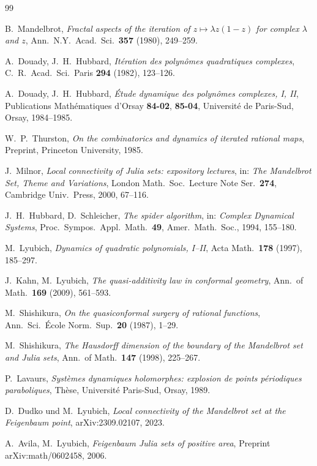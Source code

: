\documentclass[12pt,a4paper]{amsart}
\theoremstyle{definition}
\theoremstyle{remark}
\begin{document}
\begin{thebibliography}{99}


B.~Mandelbrot,
\textit{Fractal aspects of the iteration of $z \mapsto \lambda z(1-z)$ for
complex $\lambda$ and $z$},
Ann.\ N.Y.\ Acad.\ Sci.\ \textbf{357} (1980), 249--259.

A.~Douady, J.~H.~Hubbard,
\textit{Itération des polynômes quadratiques complexes},
C.\ R.\ Acad.\ Sci.\ Paris \textbf{294} (1982), 123--126.

A.~Douady, J.~H.~Hubbard,
\textit{Étude dynamique des polynômes complexes, I, II},
Publications Mathématiques d'Orsay \textbf{84-02}, \textbf{85-04},
Université de Paris-Sud, Orsay, 1984--1985.

W.~P.~Thurston,
\textit{On the combinatorics and dynamics of iterated rational maps},
Preprint, Princeton University, 1985.

J.~Milnor,
\textit{Local connectivity of Julia sets: expository lectures},
in: \textit{The Mandelbrot Set, Theme and Variations},
London Math.\ Soc.\ Lecture Note Ser.\ \textbf{274},
Cambridge Univ.\ Press, 2000, 67--116.

J.~H.~Hubbard, D.~Schleicher,
\textit{The spider algorithm},
in: \textit{Complex Dynamical Systems},
Proc.\ Sympos.\ Appl.\ Math.\ \textbf{49},
Amer.\ Math.\ Soc., 1994, 155--180.

M.~Lyubich,
\textit{Dynamics of quadratic polynomials, I--II},
Acta Math.\ \textbf{178} (1997), 185--297.

J.~Kahn, M.~Lyubich,
\textit{The quasi-additivity law in conformal geometry},
Ann.\ of Math.\ \textbf{169} (2009), 561--593.

M.~Shishikura,
\textit{On the quasiconformal surgery of rational functions},
Ann.\ Sci.\ École Norm.\ Sup.\ \textbf{20} (1987), 1--29.

M.~Shishikura,
\textit{The Hausdorff dimension of the boundary of the Mandelbrot set and
Julia sets},
Ann.\ of Math.\ \textbf{147} (1998), 225--267.

P.~Lavaurs,
\textit{Systèmes dynamiques holomorphes: explosion de points périodiques
paraboliques},
Thèse, Université Paris-Sud, Orsay, 1989.

D.~Dudko und M.~Lyubich,
\textit{Local connectivity of the Mandelbrot set at the Feigenbaum point},
arXiv:2309.02107, 2023.

A.~Avila, M.~Lyubich,
\textit{Feigenbaum Julia sets of positive area},
Preprint arXiv:math/0602458, 2006.

\end{thebibliography}
\end{document}
